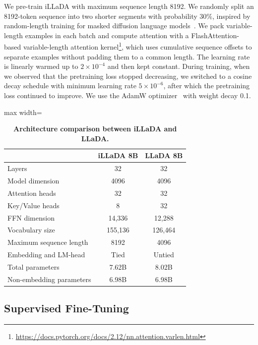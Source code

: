 \documentclass[]{bytedance_seed}
\begin{document}
We pre-train iLLaDA with maximum sequence length 8192. We randomly split an 8192-token sequence into two shorter segments with probability \(30\%\), inspired by random-length training for masked diffusion language models~\citep{nie2024scaling}. We pack variable-length examples in each batch and compute attention with a FlashAttention-based variable-length attention kernel\footnote{\url{https://docs.pytorch.org/docs/2.12/nn.attention.varlen.html}}, which uses cumulative sequence offsets to separate examples without padding them to a common length. The learning rate is linearly warmed up to \(2 \times 10^{-4}\) and then kept constant. During training, when we observed that the pretraining loss stopped decreasing, we switched to a cosine decay schedule with minimum learning rate \(5 \times 10^{-6}\), after which the pretraining loss continued to improve. We use the AdamW optimizer~\citep{loshchilov2017decoupled} with weight decay 0.1.

\begin{table}[t!]
    \centering
    \caption{\textbf{Architecture comparison between iLLaDA and LLaDA.}}
    \label{tab:architecture}
    \vspace{.2cm}
    \begin{adjustbox}{max width=\textwidth}
    \begin{tabular}{lcc}
      \toprule
        & iLLaDA 8B & LLaDA 8B \\
      \midrule
      Layers & 32 & 32 \\
      Model dimension & 4096 & 4096 \\
      Attention heads & 32 & 32 \\
      Key/Value heads & 8 & 32 \\
      FFN dimension & 14,336 & 12,288 \\
      Vocabulary size & 155,136 & 126,464 \\
      Maximum sequence length & 8192 & 4096 \\
      Embedding and LM-head & Tied & Untied \\
      Total parameters & 7.62B & 8.02B \\
      Non-embedding parameters & 6.98B & 6.98B \\
      \bottomrule
    \end{tabular}
    \end{adjustbox}
    \vspace{-.2cm}
\end{table}

\subsection{Supervised Fine-Tuning}
\label{sec:sft}
\end{document}
